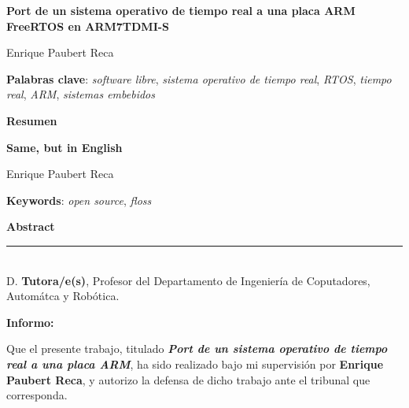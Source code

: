 \thispagestyle{empty}

\begin{center}
	{\large\bfseries Port de un sistema operativo de tiempo real a una placa ARM \\ FreeRTOS en ARM7TDMI-S }\\
\end{center}
\begin{center}
	Enrique Paubert Reca\\
\end{center}


\vspace{0.5cm}
\noindent\textbf{Palabras clave}: \textit{software libre}, \textit{sistema operativo de tiempo real}, \textit{RTOS}, \textit{tiempo real}, \textit{ARM}, \textit{sistemas embebidos}
\vspace{0.7cm}

\noindent\textbf{Resumen}\\


\cleardoublepage

\begin{center}
	{\large\bfseries Same, but in English}\\
\end{center}
\begin{center}
	Enrique Paubert Reca\\
\end{center}
\vspace{0.5cm}
\noindent\textbf{Keywords}: \textit{open source}, \textit{floss}
\vspace{0.7cm}

\noindent\textbf{Abstract}\\


\cleardoublepage

\thispagestyle{empty}

\noindent\rule[-1ex]{\textwidth}{2pt}\\[4.5ex]

D. \textbf{Tutora/e(s)}, Profesor del Departamento de Ingeniería de Coputadores, Automátca y Robótica.

\vspace{0.5cm}

\textbf{Informo:}

\vspace{0.5cm}

Que el presente trabajo, titulado \textit{\textbf{Port de un sistema operativo de tiempo real a una placa ARM}},
ha sido realizado bajo mi supervisión por \textbf{Enrique Paubert Reca}, y autorizo la defensa de dicho trabajo ante el tribunal
que corresponda.

